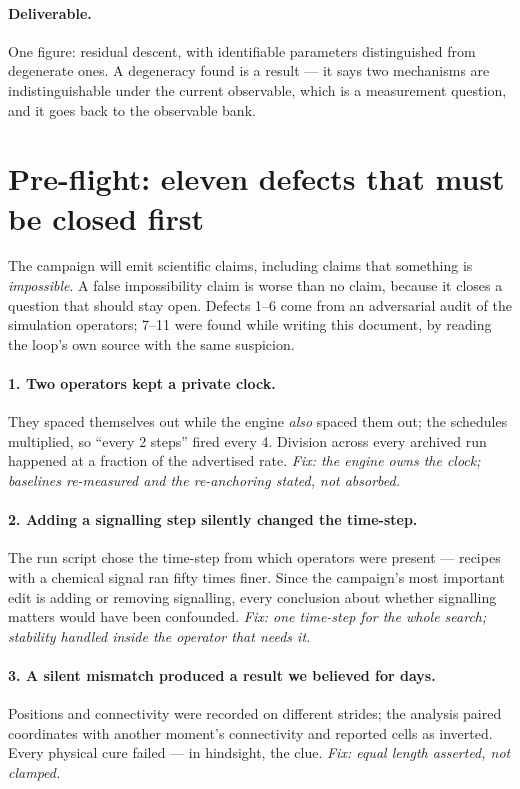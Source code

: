 \documentclass[11pt]{article}
\begin{document}
\paragraph{Deliverable.} One figure: residual descent, with identifiable parameters distinguished
from degenerate ones. A degeneracy found is a result --- it says two mechanisms are
indistinguishable under the current observable, which is a measurement question, and it goes back
to the observable bank.

\section{Pre-flight: eleven defects that must be closed first}
\label{sec:defects}

The campaign will emit scientific claims, including claims that something is \emph{impossible}. A
false impossibility claim is worse than no claim, because it closes a question that should stay
open. Defects 1--6 come from an adversarial audit of the simulation operators; 7--11 were found
while writing this document, by reading the loop's own source with the same suspicion.

\paragraph{1. Two operators kept a private clock.} They spaced themselves out while the engine
\emph{also} spaced them out; the schedules multiplied, so ``every 2 steps'' fired every 4.
Division across every archived run happened at a fraction of the advertised rate. \emph{Fix:
the engine owns the clock; baselines re-measured and the re-anchoring stated, not absorbed.}

\paragraph{2. Adding a signalling step silently changed the time-step.} The run script chose the
time-step from which operators were present --- recipes with a chemical signal ran fifty times
finer. Since the campaign's most important edit is adding or removing signalling, every
conclusion about whether signalling matters would have been confounded. \emph{Fix: one time-step
for the whole search; stability handled inside the operator that needs it.}

\paragraph{3. A silent mismatch produced a result we believed for days.} Positions and
connectivity were recorded on different strides; the analysis paired coordinates with another
moment's connectivity and reported cells as inverted. Every physical cure failed --- in hindsight,
the clue. \emph{Fix: equal length asserted, not clamped.}
\end{document}
